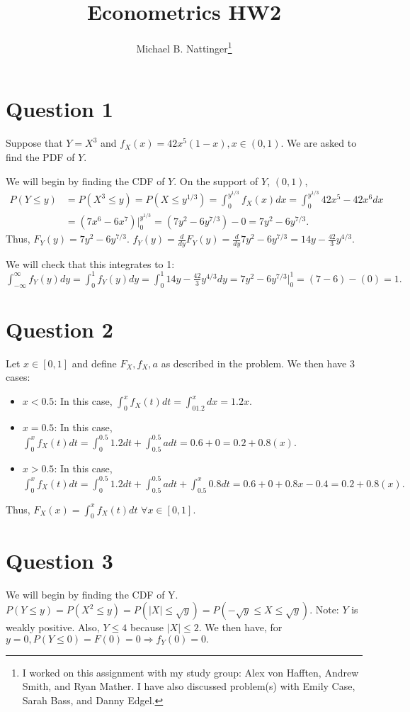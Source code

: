 \documentclass[11pt]{article} %
\title{Econometrics HW2}
\author{Michael B. Nattinger\footnote{I worked on this assignment with my study group: Alex von Hafften, Andrew Smith, and Ryan Mather. I have also discussed problem(s) with Emily Case, Sarah Bass, and Danny Edgel.}}
\begin{document}
\maketitle

\section{Question 1}
Suppose that $Y = X^{3}$ and $f_X(x) = 42x^5(1-x), x \in (0,1).$ We are asked to find the PDF of $Y$.

We will begin by finding the CDF of $Y$. On the support of $Y$, $(0,1)$,
\begin{align*}
P(Y\leq y) &= P(X^{3} \leq y) = P(X \leq y^{1/3}) = \int_0^{y^{1/3}} f_X(x)dx =  \int_0^{y^{1/3}}42x^5 - 42x^6dx \\
&= (7x^6 - 6x^7)|^{y^{1/3}}_{0} = (7y^2 - 6y^{7/3}) - 0 = 7y^2 - 6y^{7/3}.
\end{align*}
Thus, $F_Y(y) =  7y^2 - 6y^{7/3}$. $f_Y(y) = \frac{d}{dy} F_Y(y) =  \frac{d}{dy} 7y^2 - 6y^{7/3} = 14y - \frac{42}{3}y^{4/3}$.

We will check that this integrates to 1:
$\int_{-\infty}^{\infty} f_Y(y)dy = \int_0^1f_Y(y)dy =  \int_0^1 14y - \frac{42}{3}y^{4/3} dy = 7y^2 - 6y^{7/3}|_0^1 =  (7 - 6) - (0) = 1. $

\section{Question 2}
Let $x \in [0,1]$ and define $F_X,f_X,a$ as described in the problem. We then have 3 cases:

\begin{itemize}
\item $x<0.5$: In this case, $\int^{x}_0 f_X(t)dt = \int^{x}_01.2 dx = 1.2x.$
\item $x=0.5$: In this case,  $\int^{x}_0 f_X(t)dt = \int^{0.5}_0 1.2dt + \int^{0.5}_{0.5} a dt = 0.6 + 0 = 0.2+0.8(x).$
\item $x>0.5$: In this case,  $\int^{x}_0 f_X(t)dt = \int^{0.5}_0 1.2dt + \int^{0.5}_{0.5} a dt + \int^{x}_{0.5} 0.8 dt = 0.6 + 0 + 0.8x - 0.4 = 0.2+0.8(x).$
\end{itemize}

Thus, $F_X(x) = \int_0^x f_X(t)dt$ $\forall x \in [0,1].$

\section{Question 3}
We will begin by finding the CDF of Y. $P(Y\leq y) = P(X^2 \leq y) = P(|X| \leq \sqrt{y}) = P(-\sqrt{y}\leq X \leq \sqrt{y})$. Note: $Y$ is weakly positive. Also, $Y\leq 4$ because $|X| \leq 2. $ We then have, for $y=0, P(Y\leq 0) = F(0) = 0 \Rightarrow f_Y(0) = 0.$
\end{document}
